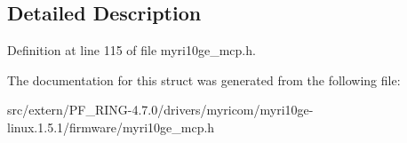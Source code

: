 \subsection{Detailed Description}


Definition at line 115 of file myri10ge\_\-mcp.h.



The documentation for this struct was generated from the following file:\begin{DoxyCompactItemize}
\item 
src/extern/PF\_\-RING-\/4.7.0/drivers/myricom/myri10ge-\/linux.1.5.1/firmware/myri10ge\_\-mcp.h\end{DoxyCompactItemize}
